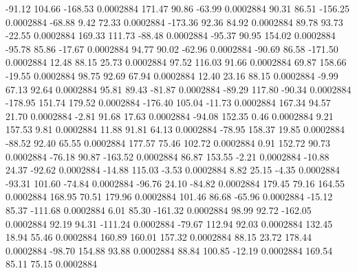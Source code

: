       -91.12      104.66     -168.53     0.0002884
      171.47       90.86      -63.99     0.0002884
       90.31       86.51     -156.25     0.0002884
      -68.88        9.42       72.33     0.0002884
     -173.36       92.36       84.92     0.0002884
       89.78       93.73      -22.55     0.0002884
      169.33      111.73      -88.48     0.0002884
      -95.37       90.95      154.02     0.0002884
      -95.78       85.86      -17.67     0.0002884
       94.77       90.02      -62.96     0.0002884
      -90.69       86.58     -171.50     0.0002884
       12.48       88.15       25.73     0.0002884
       97.52      116.03       91.66     0.0002884
       69.87      158.66      -19.55     0.0002884
       98.75       92.69       67.94     0.0002884
       12.40       23.16       88.15     0.0002884
       -9.99       67.13       92.64     0.0002884
       95.81       89.43      -81.87     0.0002884
      -89.29      117.80      -90.34     0.0002884
     -178.95      151.74      179.52     0.0002884
     -176.40      105.04      -11.73     0.0002884
      167.34       94.57       21.70     0.0002884
       -2.81       91.68       17.63     0.0002884
      -94.08      152.35        0.46     0.0002884
        9.21      157.53        9.81     0.0002884
       11.88       91.81       64.13     0.0002884
      -78.95      158.37       19.85     0.0002884
      -88.52       92.40       65.55     0.0002884
      177.57       75.46      102.72     0.0002884
        0.91      152.72       90.73     0.0002884
      -76.18       90.87     -163.52     0.0002884
       86.87      153.55       -2.21     0.0002884
      -10.88       24.37      -92.62     0.0002884
      -14.88      115.03       -3.53     0.0002884
        8.82       25.15       -4.35     0.0002884
      -93.31      101.60      -74.84     0.0002884
      -96.76       24.10      -84.82     0.0002884
      179.45       79.16      164.55     0.0002884
      168.95       70.51      179.96     0.0002884
      101.46       86.68      -65.96     0.0002884
      -15.12       85.37     -111.68     0.0002884
        6.01       85.30     -161.32     0.0002884
       98.99       92.72     -162.05     0.0002884
       92.19       94.31     -111.24     0.0002884
      -79.67      112.94       92.03     0.0002884
      132.45       18.94       55.46     0.0002884
      160.89      160.01      157.32     0.0002884
       88.15       23.72      178.44     0.0002884
      -98.70      154.88       93.88     0.0002884
       88.84      100.85      -12.19     0.0002884
      169.54       85.11       75.15     0.0002884
